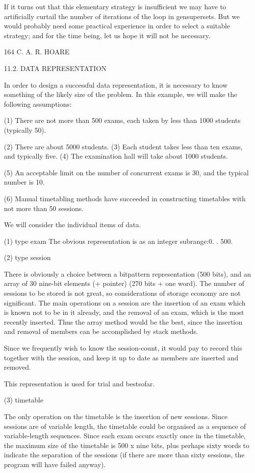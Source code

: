 If it turns out that this elementary strategy is insufficient we may have to artificially curtail the number of iterations of the loop in gensupersets. But we would probably need some practical experience in order to select a suitable strategy; and for the time being, let us hope it will not be necessary.

164 C. A. R. HOARE

11.2. DATA REPRESENTATION

In order to design a successful data representation, it is necessary to know something of the likely size of the problem. In this example, we will make the following assumptions:

(1) There are not more than 500 exams, each taken by less than 1000 students (typically 50).

(2) There are about 5000 students. (3) Each student takes less than ten exams, and typically five. (4) The examination hall will take about 1000 students.

(5) An acceptable limit on the number of concurrent exams is 30, and the typical number is 10.

(6) Manual timetabling methods have succeeded in constructing timetables with not more than 50 sessions.

We will consider the individual items of data.

(1) type exam The obvious representation is as an integer subrange:0. . 500.

(2) type session

There is obviously a choice between a bitpattern representation (500 bits), and an array of 30 nine-bit elements (+ pointer) (270 bits + one word). The number of sessions to be stored is not great, so considerations of storage economy are not significant. The main operations on a session are the insertion of an exam which is known not to be in it already, and the removal of an exam, which is the most recently inserted. Thus the array method would be the best, since the insertion and removal of members can be accomplished by stack methods.

Since we frequently wish to know the session-count, it would pay to record this together with the session, and keep it up to date as members are inserted and removed.

This representation is used for trial and bestsofar.

(3) timetable

The only operation on the timetable is the insertion of new sessions. Since sessions are of variable length, the timetable could be organised as a sequence of variable-length sequences. Since each exam occurs exactly once in the timetable, the maximum size of the timetable is 500 x nine bits, plus perhaps sixty words to indicate the separation of the sessions (if there are more than sixty sessions, the program will have failed anyway).

